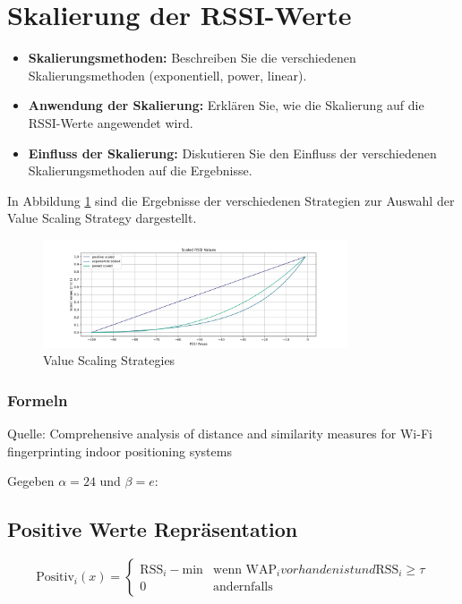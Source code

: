\section{Skalierung der RSSI-Werte}
\begin{itemize}
    \item \textbf{Skalierungsmethoden:} Beschreiben Sie die verschiedenen Skalierungsmethoden (exponentiell, power, linear).
    \item \textbf{Anwendung der Skalierung:} Erklären Sie, wie die Skalierung auf die RSSI-Werte angewendet wird.
    \item \textbf{Einfluss der Skalierung:} Diskutieren Sie den Einfluss der verschiedenen Skalierungsmethoden auf die Ergebnisse.
\end{itemize}

In Abbildung \ref{fig:value_scaling_strategies_ignore_10} sind die Ergebnisse der verschiedenen Strategien zur Auswahl der Value Scaling Strategy dargestellt.

\begin{figure}[H]
    \centering
    \includegraphics[width=0.8\textwidth]{images/value_scaling_strategies_ignore_10.png}
    \caption{Value Scaling Strategies}
    \label{fig:value_scaling_strategies_ignore_10}
\end{figure}

\subsubsection{Formeln}

Quelle: Comprehensive analysis of distance and similarity measures for Wi-Fi ﬁngerprinting indoor positioning systems

Gegeben \(\alpha = 24\) und \(\beta = e\):

\subsection*{Positive Werte Repräsentation}
\begin{equation}
\text{Positiv}_i(x) = 
\begin{cases} 
\text{RSS}_i - \text{min} & \text{wenn WAP}_i vorhanden ist und \text{RSS}_i \geq \tau \\
0 & \text{andernfalls} 
\end{cases}
\end{equation}

